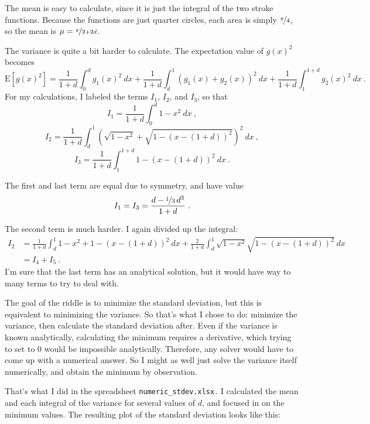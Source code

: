 \documentclass{article}
\begin{document}
The mean is easy to calculate, since it is just the integral of the two stroke functions.
Because the functions are just quarter circles, each area is simply $\nicefrac{\pi}{4}$, so the mean is $\mu=\nicefrac{\pi}{2+2d}$.

The variance is quite a bit harder to calculate.
The expectation value of $g(x)^{2}$ becomes
\[
\text{E}\left[g(x)^{2}\right]=\frac{1}{1+d}\int_{0}^{d}g_{1}(x)^{2}\ dx
+\frac{1}{1+d}\int_{d}^{1}\left(g_{1}(x)+g_{2}(x)\right)^{2}\ dx
+\frac{1}{1+d}\int_{1}^{1+d}g_{2}(x)^{2}\ dx\ .
\]
For my calculations, I labeled the terms $I_{1}$, $I_{2}$, and $I_{3}$, so that
\[
I_{1}=\frac{1}{1+d}\int_{0}^{d}1-x^{2}\ dx\ ,
\]
\[
I_{2}=\frac{1}{1+d}\int_{d}^{1}\left(\sqrt{1-x^{2}}+\sqrt{1-(x-(1+d))^{2}}\right)^2\ dx\ ,
\]
\[
I_{3}=\frac{1}{1+d}\int_{1}^{1+d}1-(x-(1+d))^{2}\ dx\ .
\]

The first and last term are equal due to symmetry, and have value
\[
I_{1}=I_{3}=\frac{d-\nicefrac{1}{3}\,d^{3}}{1+d}\ .
\]

The second term is much harder.
I again divided up the integral:
\begin{align*}
I_{2} &=\frac{1}{1+d}\int_{d}^{1}1-x^{2}+1-(x-(1+d))^{2}\ dx
+\frac{2}{1+d}\int_{d}^{1}\sqrt{1-x^{2}}\sqrt{1-(x-(1+d))^{2}}\ dx \\
&=I_{4}+I_{5}\ .
\end{align*}
I'm sure that the last term has an analytical solution, but it would have way to many terms to try to deal with.

The goal of the riddle is to minimize the standard deviation, but this is equivalent to minimizing the variance.
So that's what I chose to do: minimize the variance, then calculate the standard deviation after.
Even if the variance is known analytically, calculating the minimum requires a derivative, which trying to set to 0 would be impossible analytically.
Therefore, any solver would have to come up with a numerical answer.
So I might as well just solve the variance itself numerically, and obtain the minimum by observation.

\vspace{0.5in}

That's what I did in the spreadsheet \texttt{numeric\_stdev.xlsx}\,.
I calculated the mean and each integral of the variance for several values of $d$, and focused in on the minimum values.
The resulting plot of the standard deviation looks like this:
\end{document}
